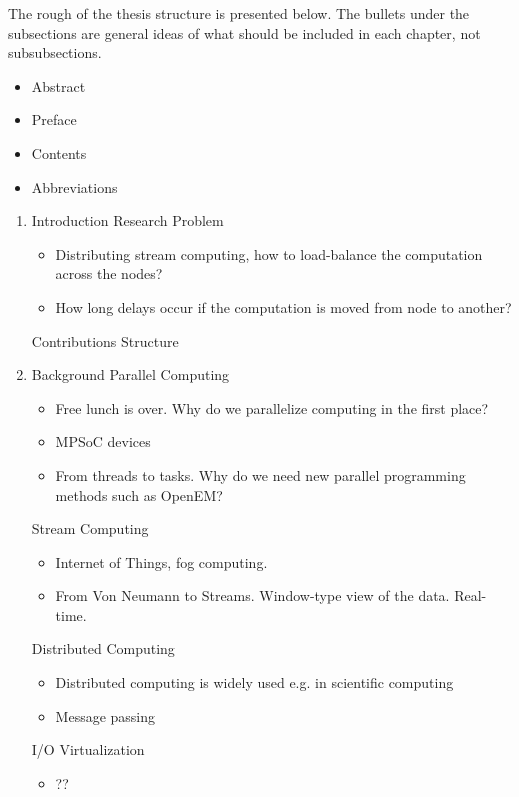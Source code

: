 The rough of the thesis structure is presented below. The bullets under the subsections are general ideas of what should be included in each chapter, not subsubsections.

\begin{itemize}
\item Abstract
\item Preface
\item Contents
\item Abbreviations
\end{itemize}

\begin{enumerate}
\item Introduction
  \subitem Research Problem
  \begin{itemize}[leftmargin=45px]
    \item Distributing stream computing, how to load-balance the computation across the nodes?
    \item How long delays occur if the computation is moved from node to another?
  \end{itemize}
  \subitem Contributions
  \subitem Structure

\item Background
  \subitem Parallel Computing
  \begin{itemize}[leftmargin=45px]
    \item Free lunch is over. Why do we parallelize computing in the first place?
    \item MPSoC devices
    \item From threads to tasks. Why do we need new parallel programming methods such as OpenEM?
  \end{itemize}
  \subitem Stream Computing
  \begin{itemize}[leftmargin=45px]
    \item Internet of Things, fog computing.
    \item From Von Neumann to Streams. Window-type view of the data. Real-time.
  \end{itemize}
  \subitem Distributed Computing
  \begin{itemize}[leftmargin=45px]
    \item Distributed computing is widely used e.g. in scientific computing
    \item Message passing
  \end{itemize}
  \subitem I/O Virtualization
  \begin{itemize}[leftmargin=45px]
    \item ??
  \end{itemize}


\end{enumerate}
